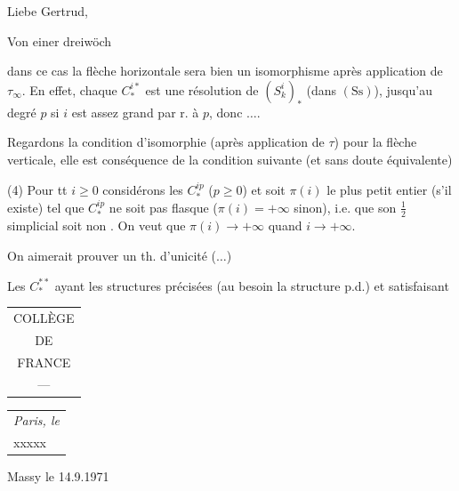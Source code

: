 Liebe Gertrud,

Von einer dreiwöch

dans ce cas la flèche horizontale sera bien un isomorphisme  après application de $\tau_\infty$. En effet, chaque $C_*^{i*}$ est une résolution de $(S_k^i)_*$ (dans $(\mathrm{Ss})$), jusqu'au degré $p$ si $i$ est assez grand par r. à $p$, donc $\ldots$.

 Regardons la condition d'isomorphie (après application de $\tau$) pour la flèche verticale, elle  est conséquence de la condition suivante (et sans doute équivalente)

(4) Pour tt $i\geq0$ considérons les  $C_*^{ip}$ ($p\geq0$) et soit $\pi(i)$ le plus petit entier (s'il existe) tel que $C_*^{ip}$ ne soit pas flasque ($\pi(i)=+\infty$ sinon),  i.e. que son \uline{} $\frac12$ simplicial  soit non . On veut que $\pi(i)\longrightarrow+\infty$ quand $i\longrightarrow+\infty$.
\begin{center}
\end{center}
On aimerait prouver un th. d'unicité ($\ldots$)

Les $C_*^{**}$ ayant les structures précisées (au besoin  la structure p.d.) et satisfaisant

\begin{tabular}{c}
COLLÈGE\\DE\\FRANCE\\---
\end{tabular}
\hfill\begin{tabular}{l}\textit{Paris, le}\\xxxxx\end{tabular}\quad Massy le 14.9.1971

